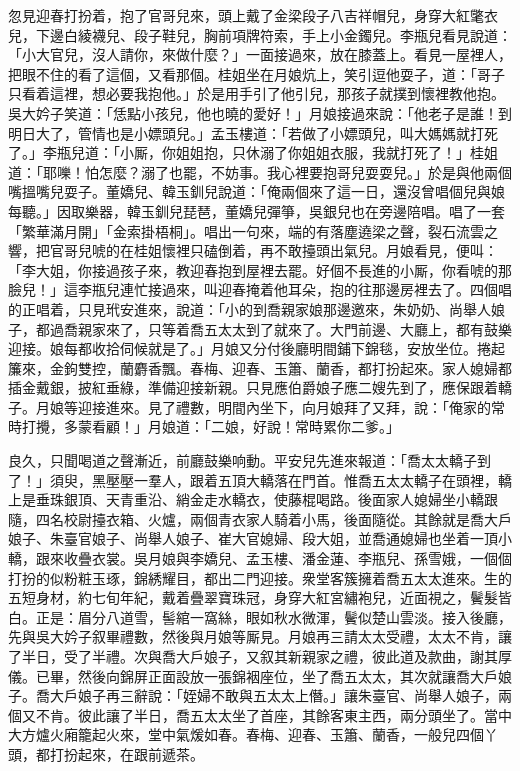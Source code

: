 忽見迎春打扮着，抱了官哥兒來，頭上戴了金梁段子八吉祥帽兒，身穿大紅氅衣兒，下邊白綾襪兒、段子鞋兒，胸前項牌符索，手上小金鐲兒。李瓶兒看見說道：「小大官兒，沒人請你，來做什麼？」一面接過來，放在膝蓋上。看見一屋裡人，把眼不住的看了這個，又看那個。桂姐坐在月娘炕上，笑引逗他耍子，道：「哥子只看着這裡，想必要我抱他。」於是用手引了他引兒，那孩子就撲到懷裡教他抱。吳大妗子笑道：「恁點小孩兒，他也曉的愛好！」月娘接過來說：「他老子是誰！到明日大了，管情也是小嫖頭兒。」孟玉樓道：「若做了小嫖頭兒，叫大媽媽就打死了。」李瓶兒道：「小厮，你姐姐抱，只休溺了你姐姐衣服，我就打死了！」桂姐道：「耶嚛！怕怎麼？溺了也罷，不妨事。我心裡要抱哥兒耍耍兒。」於是與他兩個嘴搵嘴兒耍子。董嬌兒、韓玉釧兒說道：「俺兩個來了這一日，還沒曾唱個兒與娘每聽。」因取樂器，韓玉釧兒琵琶，董嬌兒彈箏，吳銀兒也在旁邊陪唱。唱了一套「繁華滿月開」「金索掛梧桐」。唱出一句來，端的有落塵遶梁之聲，裂石流雲之響，把官哥兒唬的在桂姐懷裡只磕倒着，再不敢擡頭出氣兒。月娘看見，便叫：「李大姐，你接過孩子來，教迎春抱到屋裡去罷。好個不長進的小厮，你看唬的那臉兒！」這李瓶兒連忙接過來，叫迎春掩着他耳朵，抱的往那邊房裡去了。四個唱的正唱着，只見玳安進來，說道：「小的到喬親家娘那邊邀來，朱奶奶、尚舉人娘子，都過喬親家來了，只等着喬五太太到了就來了。大門前邊、大廳上，都有鼓樂迎接。娘每都收拾伺候就是了。」月娘又分付後廳明間鋪下錦毯，安放坐位。捲起簾來，金鉤雙控，蘭麝香飄。春梅、迎春、玉簫、蘭香，都打扮起來。家人媳婦都插金戴銀，披紅垂綠，準備迎接新親。只見應伯爵娘子應二嫂先到了，應保跟着轎子。月娘等迎接進來。見了禮數，明間內坐下，向月娘拜了又拜，說：「俺家的常時打攪，多蒙看顧！」月娘道：「二娘，好說！常時累你二爹。」

良久，只聞喝道之聲漸近，前廳鼓樂响動。平安兒先進來報道：「喬太太轎子到了！」須臾，黑壓壓一羣人，跟着五頂大轎落在門首。惟喬五太太轎子在頭裡，轎上是垂珠銀頂、天青重沿、綃金走水轎衣，使藤棍喝路。後面家人媳婦坐小轎跟隨，四名校尉擡衣箱、火爐，兩個青衣家人騎着小馬，後面隨從。其餘就是喬大戶娘子、朱臺官娘子、尚舉人娘子、崔大官媳婦、段大姐，並喬通媳婦也坐着一頂小轎，跟來收疊衣裳。吳月娘與李嬌兒、孟玉樓、潘金蓮、李瓶兒、孫雪娥，一個個打扮的似粉粧玉琢，錦綉耀目，都出二門迎接。衆堂客簇擁着喬五太太進來。生的五短身材，約七旬年紀，戴着疊翠寶珠冠，身穿大紅宮繡袍兒，近面視之，鬢髮皆白。正是：眉分八道雪，髻綰一窩絲，眼如秋水微渾，鬢似楚山雲淡。接入後廳，先與吳大妗子叙畢禮數，然後與月娘等厮見。月娘再三請太太受禮，太太不肯，讓了半日，受了半禮。次與喬大戶娘子，又叙其新親家之禮，彼此道及款曲，謝其厚儀。已畢，然後向錦屏正面設放一張錦裀座位，坐了喬五太太，其次就讓喬大戶娘子。喬大戶娘子再三辭說：「姪婦不敢與五太太上僭。」讓朱臺官、尚舉人娘子，兩個又不肯。彼此讓了半日，喬五太太坐了首座，其餘客東主西，兩分頭坐了。當中大方爐火廂籠起火來，堂中氣煖如春。春梅、迎春、玉簫、蘭香，一般兒四個丫頭，都打扮起來，在跟前遞茶。

